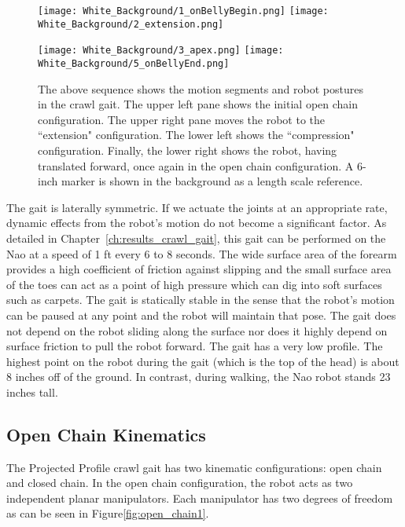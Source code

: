 \begin{figure}%
	\centerline{\texttt{[image: White\_Background/1\_onBellyBegin.png]}
				\texttt{[image: White\_Background/2\_extension.png]}
				}

	\vspace*{0.05in}

	\centerline{\texttt{[image: White\_Background/3\_apex.png]}
				\texttt{[image: White\_Background/5\_onBellyEnd.png]}
				}
	\caption{The above sequence shows the motion segments and robot postures in the crawl gait. 
				The upper left pane shows the initial open chain configuration. The upper right
				pane moves the robot to the ``extension" configuration. The lower left
				shows the ``compression" configuration. Finally, the lower right shows the 
				robot, having translated forward, once again in the open chain configuration.
				A 6-inch marker is shown in the background as a length scale reference.}
	\label{fig:nao_phases1}
\end{figure}

The gait is laterally symmetric. 
If we actuate the joints at an appropriate rate, dynamic effects from the robot's motion do not become a significant factor.
As detailed in Chapter~\ref{ch:results_crawl_gait}, this gait can be performed on the Nao at a speed of 1 ft every 6 to 8 seconds. 
The wide surface area of the forearm provides a high coefficient of friction against slipping and the small surface area of
the toes can act as a point of high pressure which can dig into soft surfaces such as carpets.
The gait is statically stable in the sense that the robot's motion can be paused at any point and the robot will maintain that pose.
The gait does not depend on the robot
sliding along the surface nor does it highly depend on surface friction to pull the robot forward.
The gait has a very low profile. The highest point on the robot during the gait (which is the top of the head)
is about 8 inches off of the ground. In contrast, during walking, the Nao robot stands 23 inches tall.

\subsection{Open Chain Kinematics}
The Projected Profile crawl gait has two kinematic configurations: open chain and closed chain. In the open chain
configuration, the robot acts as two independent planar manipulators. 
Each manipulator has two degrees of freedom as can be seen in Figure\ref{fig:open_chain1}.

